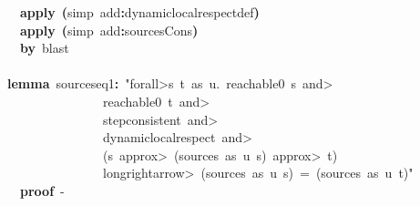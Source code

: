 \documentclass{article}
\newcommand{\syntaxKEYWORDA}[1]{\textcolor[rgb]{0.0,0.4,0.6}{\textbf{#1}}}
\newcommand{\syntaxLITERALA}[1]{\textcolor[rgb]{1.0,0.0,0.8}{#1}}
\newcommand{\syntaxOPERATOR}[1]{\textcolor[rgb]{0.0,0.0,0.0}{\textbf{#1}}}
\newcommand{\syntaxKEYWORDA}[1]{\textcolor[rgb]{0.0,0.4,0.6}{\textbf{#1}}}
\newcommand{\syntaxLITERALA}[1]{\textcolor[rgb]{1.0,0.0,0.8}{#1}}
\newcommand{\syntaxOPERATOR}[1]{\textcolor[rgb]{0.0,0.0,0.0}{\textbf{#1}}}
\newcommand{\syntaxKEYWORDA}[1]{\textcolor[rgb]{0.0,0.4,0.6}{\textbf{#1}}}
\newcommand{\syntaxLITERALA}[1]{\textcolor[rgb]{1.0,0.0,0.8}{#1}}
\newcommand{\syntaxOPERATOR}[1]{\textcolor[rgb]{0.0,0.0,0.0}{\textbf{#1}}}
\newcommand{\syntaxKEYWORDA}[1]{\textcolor[rgb]{0.0,0.4,0.6}{#1}}
\newcommand{\syntaxLITERALA}[1]{\textcolor[rgb]{1.0,0.0,0.8}{\textbf{#1}}}
\newcommand{\syntaxOPERATOR}[1]{\textcolor[rgb]{0.0,0.0,0.0}{#1}}
\newcommand{\syntaxKEYWORDA}[1]{\textcolor[rgb]{0.0,0.4,0.6}{\textbf{#1}}}
\newcommand{\syntaxLITERALA}[1]{\textcolor[rgb]{1.0,0.0,0.8}{#1}}
\newcommand{\syntaxOPERATOR}[1]{\textcolor[rgb]{0.0,0.0,0.0}{\textbf{#1}}}
\newcommand{\syntaxKEYWORDA}[1]{\textcolor[rgb]{0.0,0.4,0.6}{\textbf{#1}}}
\newcommand{\syntaxLITERALA}[1]{\textcolor[rgb]{1.0,0.0,0.8}{#1}}
\newcommand{\syntaxOPERATOR}[1]{\textcolor[rgb]{0.0,0.0,0.0}{\textbf{#1}}}
\begin{document}
{\ }{\ }{\ }{\ }{\ }{\ }{\ }\syntaxKEYWORDA{apply}{\ }\syntaxOPERATOR{(}simp{\ }add\syntaxOPERATOR{:}dynamic\usebox{\underscorebox}local\usebox{\underscorebox}respect\usebox{\underscorebox}def\syntaxOPERATOR{)}\hspace*{\fill}\\
{\ }{\ }{\ }{\ }{\ }{\ }{\ }\syntaxKEYWORDA{apply}{\ }\syntaxOPERATOR{(}simp{\ }add\syntaxOPERATOR{:}sources\usebox{\underscorebox}Cons\syntaxOPERATOR{)}\hspace*{\fill}\\
{\ }{\ }{\ }{\ }{\ }{\ }{\ }\syntaxKEYWORDA{by}{\ }blast\hspace*{\fill}\\
\hspace*{\fill}\\
{\ }{\ }{\ }{\ }{\ }\syntaxKEYWORDA{lemma}{\ }sources\usebox{\underscorebox}eq1\syntaxOPERATOR{:}{\ }\syntaxLITERALA{"\<forall>s{\ }t{\ }as{\ }u.{\ }reachable0{\ }s{\ }\<and>}\hspace*{\fill}\\
\syntaxLITERALA{{\ }{\ }{\ }{\ }{\ }{\ }{\ }{\ }{\ }{\ }{\ }{\ }{\ }{\ }{\ }{\ }{\ }{\ }{\ }{\ }reachable0{\ }t{\ }\<and>}\hspace*{\fill}\\
\syntaxLITERALA{{\ }{\ }{\ }{\ }{\ }{\ }{\ }{\ }{\ }{\ }{\ }{\ }{\ }{\ }{\ }{\ }{\ }{\ }{\ }{\ }step\usebox{\underscorebox}consistent{\ }\<and>}\hspace*{\fill}\\
\syntaxLITERALA{{\ }{\ }{\ }{\ }{\ }{\ }{\ }{\ }{\ }{\ }{\ }{\ }{\ }{\ }{\ }{\ }{\ }{\ }{\ }{\ }dynamic\usebox{\underscorebox}local\usebox{\underscorebox}respect{\ }\<and>}\hspace*{\fill}\\
\syntaxLITERALA{{\ }{\ }{\ }{\ }{\ }{\ }{\ }{\ }{\ }{\ }{\ }{\ }{\ }{\ }{\ }{\ }{\ }{\ }{\ }{\ }(s{\ }\<approx>{\ }(sources{\ }as{\ }u{\ }s){\ }\<approx>{\ }t)}\hspace*{\fill}\\
\syntaxLITERALA{{\ }{\ }{\ }{\ }{\ }{\ }{\ }{\ }{\ }{\ }{\ }{\ }{\ }{\ }{\ }{\ }{\ }{\ }{\ }{\ }\<longrightarrow>{\ }(sources{\ }as{\ }u{\ }s){\ }={\ }(sources{\ }as{\ }u{\ }t)"}\hspace*{\fill}\\
{\ }{\ }{\ }{\ }{\ }{\ }{\ }\syntaxKEYWORDA{proof}{\ }{-}\hspace*{\fill}\\
{\ }{\ }{\ }{\ }{\ }{\ }{\ }\syntaxKEYWORDA{\usebox{\opencurlybracket}}\hspace*{\fill}\\
\end{document}

